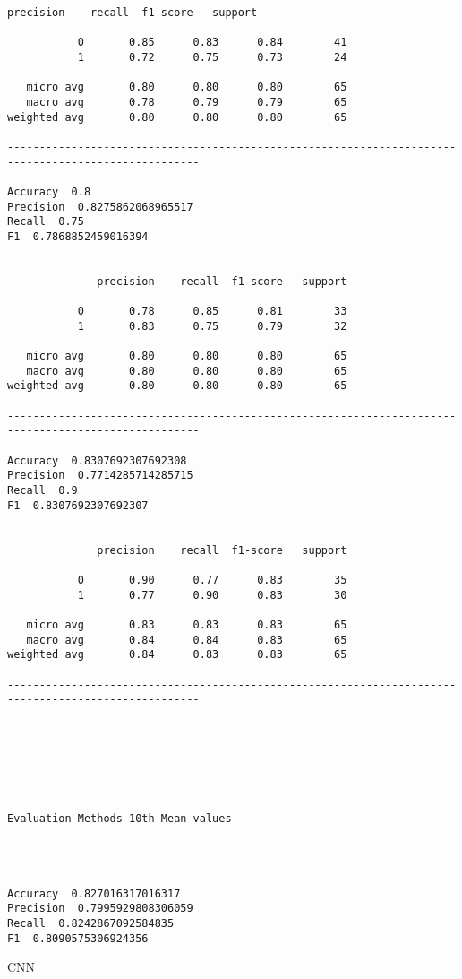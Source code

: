 \documentclass[11pt]{article}
\begin{document}
\begin{Verbatim}[commandchars=\\\{\}]
              precision    recall  f1-score   support

           0       0.85      0.83      0.84        41
           1       0.72      0.75      0.73        24

   micro avg       0.80      0.80      0.80        65
   macro avg       0.78      0.79      0.79        65
weighted avg       0.80      0.80      0.80        65

---------------------------------------------------------------------------------------------------- 

Accuracy  0.8
Precision  0.8275862068965517
Recall  0.75
F1  0.7868852459016394


              precision    recall  f1-score   support

           0       0.78      0.85      0.81        33
           1       0.83      0.75      0.79        32

   micro avg       0.80      0.80      0.80        65
   macro avg       0.80      0.80      0.80        65
weighted avg       0.80      0.80      0.80        65

---------------------------------------------------------------------------------------------------- 

Accuracy  0.8307692307692308
Precision  0.7714285714285715
Recall  0.9
F1  0.8307692307692307


              precision    recall  f1-score   support

           0       0.90      0.77      0.83        35
           1       0.77      0.90      0.83        30

   micro avg       0.83      0.83      0.83        65
   macro avg       0.84      0.84      0.83        65
weighted avg       0.84      0.83      0.83        65

---------------------------------------------------------------------------------------------------- 







Evaluation Methods 10th-Mean values




Accuracy  0.827016317016317
Precision  0.7995929808306059
Recall  0.8242867092584835
F1  0.8090575306924356

    \end{Verbatim}

    CNN
\end{document}
